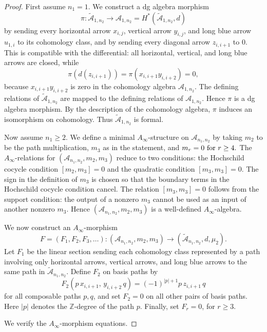 \documentclass[a4paper, reqno, 11pt]{amsart}
\theoremstyle{definition}
\begin{document}
\begin{proof}
	First assume \(n_1=1\). We construct a dg algebra morphism
	\[
	\pi:\widetilde{\mathcal A}_{1,n_2}\longrightarrow
	\mathcal A_{1,n_2}=H^\ast(\widetilde{\mathcal A}_{1,n_2},d)
	\]
	by sending every horizontal arrow \(x_{i,j}\), vertical arrow \(y_{i,j}\), and
	long blue arrow \(u_{1,i}\) to its cohomology class, and by sending every
	diagonal arrow \(z_{i,i+1}\) to \(0\). This is compatible with the differential:
	all horizontal, vertical, and long blue arrows are closed, while
	\[
	\pi(d(z_{i,i+1}))
	=
	\pi(x_{i,i+1}y_{i,i+2})
	=
	0,
	\]
	because \(x_{i,i+1}y_{i,i+2}\) is zero in the cohomology algebra
	\(\mathcal A_{1,n_2}\). The defining relations of
	\(\widetilde{\mathcal A}_{1,n_2}\) are mapped to the defining relations of
	\(\mathcal A_{1,n_2}\). Hence \(\pi\) is a dg algebra morphism. By the
	description of the cohomology algebra, \(\pi\) induces an isomorphism on
	cohomology. Thus \(\widetilde{\mathcal A}_{1,n_2}\) is formal.
	
	Now assume \(n_1\ge 2\). We define a minimal \(A_\infty\)-structure on
	\(\mathcal A_{n_1,n_2}\) by taking \(m_2\) to be the path multiplication,
	\(m_3\) as in the statement, and \(m_r=0$ for $r\ge 4.\)
	The \(A_\infty\)-relations for \((\mathcal A_{n_1,n_2},m_2,m_3)\) reduce to two conditions: the Hochschild cocycle condition \([m_2,m_3]=0\) and the quadratic condition \([m_3,m_3]=0\). The sign in the definition of \(m_3\) is chosen so that the boundary terms in the Hochschild cocycle condition cancel. The relation \([m_3,m_3]=0\) follows from the support condition: the output of a nonzero \(m_3\) cannot be used as an input of another nonzero \(m_3\). Hence \((\mathcal A_{n_1,n_2},m_2,m_3)\) is a well-defined  \(A_\infty\)-algebra.
	
	We now construct an \(A_\infty\)-morphism
	\[
	F=(F_1,F_2,F_3,\dots):(\mathcal A_{n_1,n_2},m_2,m_3)
	\longrightarrow
	(\widetilde{\mathcal A}_{n_1,n_2},d,\mu_2).
	\]
	Let \(F_1\) be the linear section sending each cohomology class represented by a
	path involving only horizontal arrows, vertical arrows, and long blue arrows to
	the same path in \(\widetilde{\mathcal A}_{n_1,n_2}\). 
	Define \(F_2\) on basis paths by
	\[
	F_2(p\,x_{i,i+1},\,y_{i,i+2}\,q)
	=
	(-1)^{|p|+1}p\,z_{i,i+1}\,q
	\]
	for all composable paths \(p,q\), and set \(F_2=0\) on all other pairs of basis
	paths. Here \(|p|\) denotes the \(\mathbb Z\)-degree of the path \(p\). Finally, set $F_r=0$, for $r\ge 3$.
	
	We verify the \(A_\infty\)-morphism equations. 
	

\end{proof}
\end{document}
